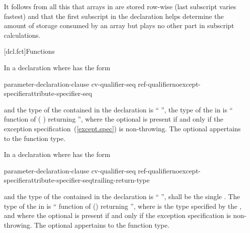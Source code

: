 \pnum
\begin{note}
It follows from all this that arrays in \Cpp are stored
row-wise (last subscript varies fastest)
%
and that the first subscript in the declaration helps determine
the amount of storage consumed by an array
but plays no other part in subscript calculations.
\end{note}

[dcl.fct]{Functions}%

\pnum
{}%
In a declaration
where
has the form

\begin{ncsimplebnf}
 parameter-declaration-clause \terminal{)} cv-qualifier-seq\opt\br
\hspace*{\bnfindentinc}ref-qualifier\opt noexcept-specifier\opt attribute-specifier-seq\opt
\end{ncsimplebnf}

and the type of the contained
in the declaration
is
``
'',
the type of the
in
is
``
\opt
function of
( )
 
returning '',
where the optional  is present
if and only if
the exception specification~(\ref{except.spec}) is non-throwing.
The optional 
appertains to the function type.

\pnum
In a declaration
where
has the form

\begin{ncsimplebnf}
 parameter-declaration-clause \terminal{)} cv-qualifier-seq\opt\br
\hspace*{\bnfindentinc}ref-qualifier\opt noexcept-specifier\opt attribute-specifier-seq\opt trailing-return-type
\end{ncsimplebnf}

and the type of the contained
in the declaration
is
`` '',
 shall be the single  .
The type of the
in
is
``
\opt
function of
()
\opt {}\opt
returning '',
where  is the type specified by
the , and
where the optional  is present if and only if
the exception specification is non-throwing.
The optional 
appertains to the function type.

